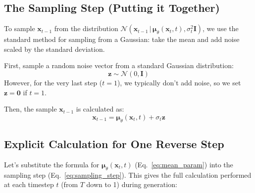 \documentclass{article}
\newcommand{\bz}{\bm{z}}
\newcommand{\bx}{\bm{x}}
\newcommand{\bmu}{\bm{\mu}}
\newcommand{\bI}{\mathbf{I}}
\begin{document}
\subsection{The Sampling Step (Putting it Together)}

To sample $\bx_{t-1}$ from the distribution $\mathcal{N}(\bx_{t-1} \,|\, \bmu_\theta(\bx_t, t), \sigma_t^2 \bI)$, we use the standard method for sampling from a Gaussian: take the mean and add noise scaled by the standard deviation.

First, sample a random noise vector from a standard Gaussian distribution:
\begin{equation}
    \bz \sim \mathcal{N}(0, \bI)
\end{equation}
However, for the very last step ($t=1$), we typically don't add noise, so we set $\bz = \mathbf{0}$ if $t=1$.

Then, the sample $\bx_{t-1}$ is calculated as:
\begin{equation} \label{eq:sampling_step}
    \bx_{t-1} = \bmu_\theta(\bx_t, t) + \sigma_t \bz
\end{equation}

\subsection{Explicit Calculation for One Reverse Step}

Let's substitute the formula for $\bmu_\theta(\bx_t, t)$ (Eq.~\ref{eq:mean_param}) into the sampling step (Eq.~\ref{eq:sampling_step}). This gives the full calculation performed at each timestep $t$ (from $T$ down to 1) during generation:
\end{document}
